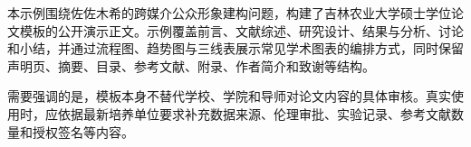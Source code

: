 本示例围绕佐佐木希的跨媒介公众形象建构问题，构建了吉林农业大学硕士学位论文模板的公开演示正文。示例覆盖前言、文献综述、研究设计、结果与分析、讨论和小结，并通过流程图、趋势图与三线表展示常见学术图表的编排方式，同时保留声明页、摘要、目录、参考文献、附录、作者简介和致谢等结构。

需要强调的是，模板本身不替代学校、学院和导师对论文内容的具体审核。真实使用时，应依据最新培养单位要求补充数据来源、伦理审批、实验记录、参考文献数量和授权签名等内容。
